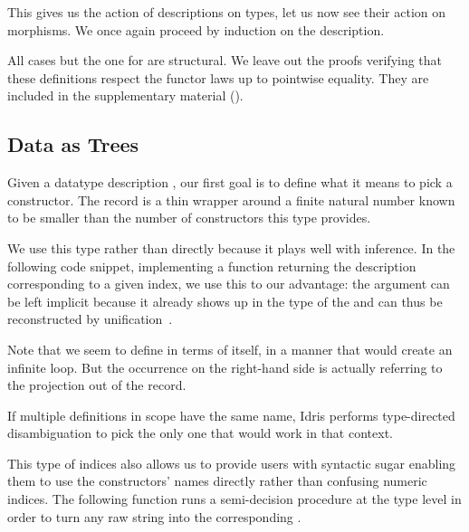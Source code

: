 
This gives us the action of descriptions on types, let us now
see their action on morphisms.
%
We once again proceed by induction on the description.

\label{def:fmap}

All cases but the one for  are structural.
%
We leave out the proofs verifying that these definitions
respect the functor laws up to pointwise equality.
They are included in the supplementary material
().

\subsection{Data as Trees}

Given a datatype description , our first goal is
to define what it means to pick a constructor.
%
The  record is a thin wrapper around a finite
natural number known to be smaller than the number of constructors
this type provides.


We use this type rather than  directly because it
plays well with inference.
%
In the following code snippet, implementing a function returning
the description corresponding to a given index,
we use this to our advantage:
the  argument can be left implicit because it already
shows up in the type of the  and can thus be
reconstructed by unification~\citep{DBLP:conf/tlca/AbelP11}.


Note that we seem to define 
in terms of itself, in a manner that would create an
infinite loop.
%
But the occurrence on the right-hand side is actually
referring to the projection out of the
 record.

\begin{remark}
  If multiple definitions in scope have the same name,
  Idris performs type-directed disambiguation to pick
  the only one that would work in that context.
\end{remark}

This type of indices also allows us to provide users with
syntactic sugar enabling them to use the constructors' names
directly rather than confusing numeric indices.
%
The following function runs a semi-decision procedure
 at the type level
in order to turn any raw string 
into the corresponding .

